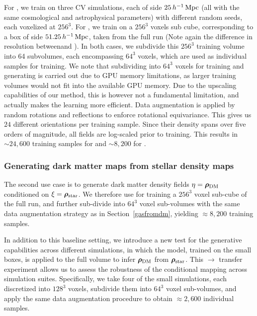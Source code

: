 For \CAMELS, we train on three CV simulations, each of side $25\,h^{-1}\,\mathrm{Mpc}$ (all with the same cosmological and astrophysical parameters) with different random seeds, each voxelized at $256^3$. For \TNG, we train on a $256^3$ voxels sub cube, corresponding to a box of side $51.25\,h^{-1}\,\mathrm{Mpc}$, taken from the full \TNG run (Note again the difference in resolution between\CAMELS and \TNG). In both cases, we subdivide this $256^3$ training volume into 64 subvolumes, each encompassing $64^3$ voxels, which are used as individual samples for training. We note that subdividing into $64^3$ voxels for training and generating is carried out due to GPU memory limitations, as larger training volumes would not fit into the available GPU memory. Due to the upscaling capabilities of our method, this is however not a fundamental limitation, and actually makes the learning more efficient. Data augmentation is applied by random rotations and reflections to enforce rotational equivariance. This gives us $24$ different orientations per training sample. Since their density spans over five orders of magnitude, all fields are log-scaled prior to training. This results in $\sim24{,}600$ training samples for \CAMELS and $\sim8{,}200$ for \TNG.

\subsubsection{Generating dark matter maps from stellar density maps}\label{dmfromstar}

The second use case is to generate dark matter density fields $\eta=\boldsymbol{\rho}_\mathrm{DM}$ conditioned on $\xi=\bm{\rho}_\text{star}$. We therefore use for training a $256^3$ voxel sub-cube of the full \TNG run, and further sub-divide into $64^3$ voxel sub-volumes with the same data augmentation strategy as in Section~\ref{gasfromdm}, yielding $\approx 8{,}200$ training samples.

\vspace{\baselineskip}

In addition to this baseline setting, we introduce a new test for the generative capabilities across different simulations, in which the model, trained on the small \CAMELS boxes, is applied to the full \TNG volume to infer $\boldsymbol{\rho}_\mathrm{DM}$ from $\bm{\rho}_\text{star}$. This \CAMELS $\rightarrow$ \TNG transfer experiment allows us to assess the robustness of the conditional mapping across simulation suites. Specifically, we take four of the small \CAMELS simulations, each discretized into $128^3$ voxels, subdivide them into $64^3$ voxel sub-volumes, and apply the same data augmentation procedure to obtain $\approx2{,}600$ individual samples.

